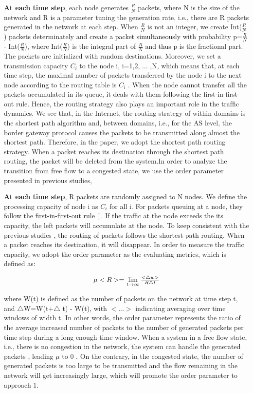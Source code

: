 \documentclass[onecolumn,preprintnumbers,amsmath,amssymb]{revtex4}
\begin{document}
{\bf At each time step}, each node generates $\frac{R}{N}$ packets, where N is the size of the network and R is a parameter tuning the generation rate, i.e., there are R packets generated in the network at each step. When $\frac{R}{N}$ is not an integer, we create Int($\frac{R}{N}$) packets determinately and create a packet simultaneously with probability p=$\frac{R}{N}$ - Int($\frac{R}{N}$), where Int($\frac{R}{N}$) is the integral part of $\frac{R}{N}$ and thus p is the fractional part. The packets are initialized with random destinations. Moreover, we set a transmission capacity $C_i$ to the node i, i=1,2, ... ,N, which means that, at each time step, the maximal number of packets transferred by the node i to the next node according to the routing table is $C_i$ . When the node cannot transfer all the packets accumulated in its queue, it deals with them following the ﬁrst-in-ﬁrst-out rule. Hence, the routing strategy also plays an important role in the trafﬁc dynamics. We see that, in the Internet, the routing strategy of within domains is the shortest path algorithm and, between domains, i.e., for the AS level, the border gateway protocol causes the packets to be transmitted along almost the shortest path\cite{BVL}. Therefore, in the paper, we adopt the shortest path routing strategy. When a packet reaches its destination through the shortest path routing, the packet will be deleted from the system.In order to analyze the transition from free ﬂow to a congested state, we use the order parameter presented in previous studies\cite{MEN},

{\bf At each time step}, R packets are randomly assigned to N nodes.
We define the processing capacity of node i as $C_i$ for all i.
For packets queuing at a node, they follow the first-in-first-out rule []. If the traffic at the node exceeds the its capacity, the left packets will accumulate at the node.
To keep consistent with the previous studies \cite{BVL}, the routing of packets follows the shortest-path routing.
When a packet reaches its destination, it will disappear.
In order to measure the traffic capacity, we adopt the order parameter \cite{MEN} as the evaluating metrics, which is defined as:

\begin{equation}
\centerline{
$\mu<R>=$
$\lim\limits_{t \to \infty }{\frac{< \bigtriangleup w >}{R\bigtriangleup t}}$
}
\end{equation}

where W(t) is defined as the number of packets on the network at time step t, and  $\bigtriangleup$W=W(t+$\bigtriangleup$ t) - W(t), with  $<$...$>$ indicating averaging over time windows of width  t. 
In other words, the order parameter represents the ratio of the average increased number of packets to the number of generated packets per time step during a long enough time window. 
When a system in a free flow state, i.e., there is no congestion in the network, the system can handle the generated packets , leading $\mu$ to 0 . 
On the contrary, in the congested state, the number of generated packets is too large to be transmitted and the flow remaining in the network will get increasingly large, which will promote the order parameter to approach 1.
\end{document}
